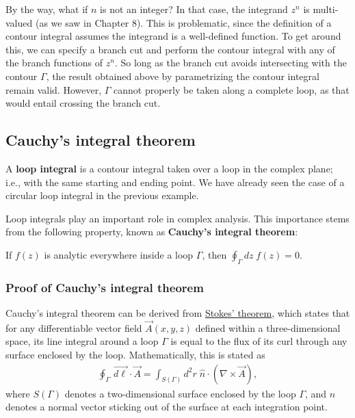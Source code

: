 \documentclass[10pt,a4paper]{article}
\begin{document}
By the way, what if $n$ is not an integer? In that case, the integrand
$z^n$ is multi-valued (as we saw in Chapter 8). This is problematic,
since the definition of a contour integral assumes the integrand is a
well-defined function. To get around this, we can specify a branch cut
and perform the contour integral with any of the branch functions of
$z^n$. So long as the branch cut avoids intersecting with the contour
$\Gamma$, the result obtained above by parametrizing the contour
integral remain valid.  However, $\Gamma$ cannot properly be taken
along a complete loop, as that would entail crossing the branch cut.

\subsection{Cauchy's integral theorem}
\label{cauchys-integral-theorem}

A \textbf{loop integral} is a contour integral taken over a loop in
the complex plane; i.e., with the same starting and ending point. We
have already seen the case of a circular loop integral in the previous
example.

Loop integrals play an important role in complex analysis. This
importance stems from the following property, known as
\textbf{Cauchy's integral theorem}:

\begin{framed}
If $f(z)$ is analytic everywhere inside a loop $\Gamma$, then $\displaystyle\oint_\Gamma dz\; f(z) = 0.$
\end{framed}

\subsubsection{Proof of Cauchy's integral theorem}
\label{proof-of-cauchys-integral-theorem}

Cauchy's integral theorem can be derived from
\href{http://en.wikipedia.org/wiki/Stokes'_theorem}{Stokes' theorem},
which states that for any differentiable vector field $\vec{A}(x,y,z)$
defined within a three-dimensional space, its line integral around a
loop $\Gamma$ is equal to the flux of its curl through any surface
enclosed by the loop.  Mathematically, this is stated as
\begin{align}
  \oint_\Gamma\, \vec{d\ell} \cdot \vec{A} = \int_{S(\Gamma)} d^2r \; \hat{n} \cdot \left(\nabla \times \vec{A}\right),
\end{align}
where $S(\Gamma)$ denotes a two-dimensional surface enclosed by the
loop $\Gamma$, and $\hat{n}$ denotes a normal vector sticking out of
the surface at each integration point.
\end{document}
